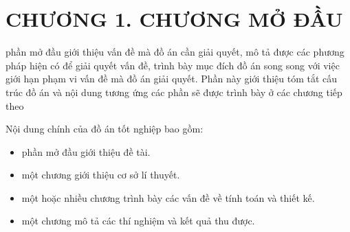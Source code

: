 \documentclass{article}
\renewcommand{\figurename}{\fontsize{12pt}{0pt}\selectfont \bfseries Hình}
\renewcommand{\tablename}{\fontsize{12pt}{0pt}\selectfont \bfseries Bảng}
\begin{document}

\cleardoublepage %

%

%

\tableofcontents %
\thispagestyle{empty}
\cleardoublepage


{\let\oldnumberline\numberline
\renewcommand{\numberline}{\figurename~\oldnumberline}
\listoffigures} %
\cleardoublepage

{\let\oldnumberline\numberline
\renewcommand{\numberline}{\tablename~\oldnumberline}
\listoftables}%
\cleardoublepage


\cleardoublepage

\section*{CHƯƠNG 1. CHƯƠNG MỞ ĐẦU}
phần mở đầu giới thiệu vấn đề mà đồ án cần giải quyết, mô tả được các phương pháp hiện có để giải quyết vấn đề, trình bày mục đích đồ án song song với việc giới hạn phạm vi vấn đề mà đồ án giải quyết. Phần này giới thiệu tóm tắt cấu trúc đồ án và nội dung tương ứng các phần sẽ được trình bày ở các chương tiếp theo

Nội dung chính của đồ án tốt nghiệp bao gồm:
\begin{itemize}
    \item phần mở đầu giới thiệu đề tài.
    \item một chương giới thiệu cơ sở lí thuyết.
    \item một hoặc nhiều chương trình bày các vấn đề về tính toán và thiết kế.
    \item một chương mô tả các thí nghiệm và kết quả thu được.
\end{itemize}
\end{document}
